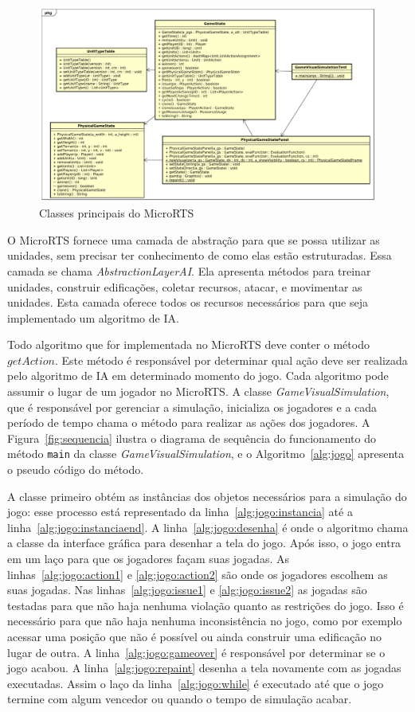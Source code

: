 \begin{figure}[ht]
	\centering
	\includegraphics[width=1\textwidth]{fig/classes.pdf}
	\caption{Classes principais do MicroRTS}
	\label{fig:classes}
\end{figure} 

O MicroRTS fornece uma camada de abstração para que se possa utilizar as unidades, sem precisar ter conhecimento de como elas estão estruturadas. 
Essa camada se chama \textit{AbstractionLayerAI}. 
Ela apresenta métodos para treinar unidades, construir edificações, coletar recursos, atacar, e movimentar as unidades. 
Esta camada oferece todos os recursos necessários para que seja implementado um algoritmo de IA.

Todo algoritmo que for implementada no MicroRTS deve conter o método $\mathit{getAction}$.
Este método é responsável por determinar qual ação deve ser realizada pelo algoritmo de IA em determinado momento do jogo.
Cada algoritmo pode assumir o lugar de um jogador no MicroRTS. 
A classe \textit{GameVisualSimulation}, que é responsável por gerenciar a simulação, inicializa os jogadores e a cada período de tempo chama o método para realizar as ações dos jogadores.
A Figura~\ref{fig:sequencia} ilustra o diagrama de sequência do funcionamento do método \texttt{main} da classe \textit{GameVisualSimulation}, e o Algoritmo~\ref{alg:jogo} apresenta o pseudo código do método.
 
A classe primeiro obtém as instâncias dos objetos necessários para a simulação do jogo: esse processo está representado da linha~\ref{alg:jogo:instancia} até a linha~\ref{alg:jogo:instanciaend}.
A linha~\ref{alg:jogo:desenha} é onde o algoritmo chama a classe da interface gráfica para desenhar a tela do jogo.
Após isso, o jogo entra em um laço para que os jogadores façam suas jogadas. As linhas~\ref{alg:jogo:action1} e \ref{alg:jogo:action2} são onde os jogadores escolhem as suas jogadas.
Nas linhas~\ref{alg:jogo:issue1} e \ref{alg:jogo:issue2} as jogadas são testadas para que não haja nenhuma violação quanto as restrições do jogo.
Isso é necessário para que não haja nenhuma inconsistência no jogo, como por exemplo acessar uma posição que não é possível ou ainda construir uma edificação no lugar de outra.
A linha~\ref{alg:jogo:gameover} é responsável por determinar se o jogo acabou.
A linha~\ref{alg:jogo:repaint} desenha a tela novamente com as jogadas executadas.
Assim o laço da linha~\ref{alg:jogo:while} é executado até que o jogo termine com algum vencedor ou quando o tempo de simulação acabar.


